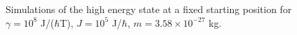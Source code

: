 \documentclass[main.tex]{subfiles}
\begin{document}
\begin{figure}[h]
    \qquad
    \caption{\centering Simulations of the high energy state at a fixed starting position for \(\gamma
    = 10^{8}\) J/(\(\hbar{}\)T), \(J= 10^{5}\) J/\(\hbar{}\), \(m = 3.58\times 10^{-27}\) kg.}%
    \label{fig:n2m-27B}
\end{figure}
\end{document}
